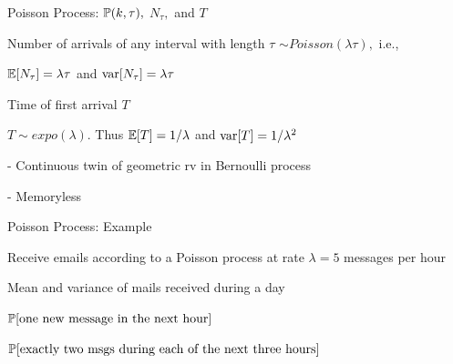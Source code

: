 \documentclass[fleqn,aspectratio=169]{beamer}
\begin{document}
\begin{frame}{Poisson Process: $\mathbb{P}( k,\tau ),$ $N_\tau,$ and $T$}

\plitemsep 0.1in
\bci
\item<2->  Number of arrivals of any interval with length $\tau$ $\sim Poisson(\lambda \tau),$ i.e., 

\item<3-> $\mathbb{E}[ N_\tau ] = \lambda \tau$ and $\text{var}[ N_\tau ] = \lambda \tau$ 

\item<4->  Time of first arrival $T$

\item<7-> $T \sim expo(\lambda).$ Thus $\mathbb{E}[ T ] = 1/\lambda$ and $\text{var}[ T ] = 1/\lambda^2$ 

- Continuous twin of geometric rv in Bernoulli process

- Memoryless


\eci
\end{frame}

\begin{frame}{Poisson Process: Example}

\plitemsep 0.15in
\bci
\item Receive emails according to a Poisson process at rate $\lambda =5$ messages per hour

\item Mean and variance of mails received during a day


\item $\mathbb{P}[ \text{one new message in the next hour} ]$


\item $\mathbb{P}[ \text{exactly two msgs during each of the next three hours} ]$

\eci
\end{frame}
\end{document}
